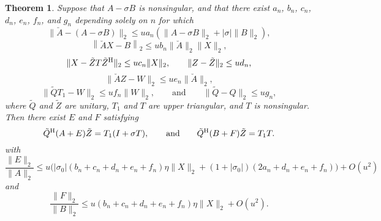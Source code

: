 \documentclass[12pt]{article}
\def\eqand{\qquad\mbox{and}\qquad}
\def\H{{\rm H}}
\newtheorem{theorem}{Theorem}
\begin{document}
\begin{theorem}
  \label{th:generalized_schur}
  Suppose that $A-\sigma B$ is nonsingular, and that there exist
  $a_n$, $b_n$, $c_n$, $d_n$, $e_n$, $f_n$, and $g_n$ depending solely
  on $n$ for which
  \begin{equation}
    \label{eq:shift_error}
    \|\breve{A} - (A-\sigma B)\|_2 \leq u a_n (\|A-\sigma B\|_2 + |\sigma| \|B\|_2),
  \end{equation}
  \begin{equation}
    \label{eq:Xerror}
    \left\| \breve{A} X - B \right\|_2 
    \leq u b_n \|\breve{A}\|_2\|X\|_2,
  \end{equation}
  \begin{equation}
    \label{eq:schur_error}
    \| X - \tilde{Z} T \tilde{Z}^\H \|_2 \leq u c_n \|X\|_2,\qquad
    \|Z - \tilde{Z}\|_2 \leq u d_n,
  \end{equation}
  \begin{equation}
    \label{eq:AZerror}
    \|\breve{A} Z - W\|_2 \leq u e_n \|\breve{A}\|_2,
  \end{equation}
  \begin{equation}
    \label{eq:QRerror}
    \|\tilde{Q}T_1 - W\|_2 \leq u f_n \|W\|_2, \eqand
    \|\tilde{Q} - Q\|_2 \leq ug_n ,
  \end{equation}
  where $\tilde{Q}$ and $\tilde{Z}$ are unitary, $T_1$ and $T$ are
  upper triangular, and $T$ is nonsingular.  Then there exist $E$ and
  $F$ satisfying
  \begin{equation*}
    \tilde{Q}^\H (A+E) \tilde{Z} = T_1(I+\sigma T),\eqand \tilde{Q}^\H (B+F) \tilde{Z}
    = T_1 T.
  \end{equation*}
  with
  \begin{equation*}
    \frac{\|E\|_2}{\|A\|_2} \leq
    u \Big(|\sigma_0| (b_n + c_n + d_n + e_n + f_n) \eta \|X\|_2 + (1+|\sigma_0|)(2a_n + d_n+e_n+f_n)\Big) +O(u^2)    
  \end{equation*}
  and
  \begin{equation*}
    \frac{\|F\|_2}{\|B\|_2} \leq
    u \left( b_n + c_n +d_n +e_n + f_n\right) \eta \|X\|_2 + O(u^2).
  \end{equation*}
\end{theorem}
\end{document}
